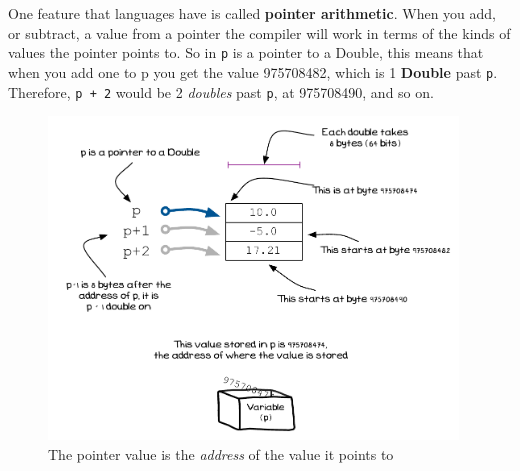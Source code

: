 One feature that languages have is called \textbf{pointer arithmetic}. When you add, or subtract, a value from a pointer the compiler will work in terms of the kinds of values the pointer points to. So in  \texttt{p} is a pointer to a Double, this means that when you add one to p you get the value 975708482, which is 1 \textbf{Double} past \texttt{p}. Therefore, \texttt{p + 2} would be 2 \emph{doubles} past \texttt{p}, at 975708490, and so on.

\begin{figure}[h]
   \centering
   \includegraphics[width=0.97\textwidth]{./topics/dynamic-memory/diagrams/PointerArithmetic} 
   \caption{The pointer value is the \emph{address} of the value it points to}
   \label{fig:pointer-actions}
\end{figure}



